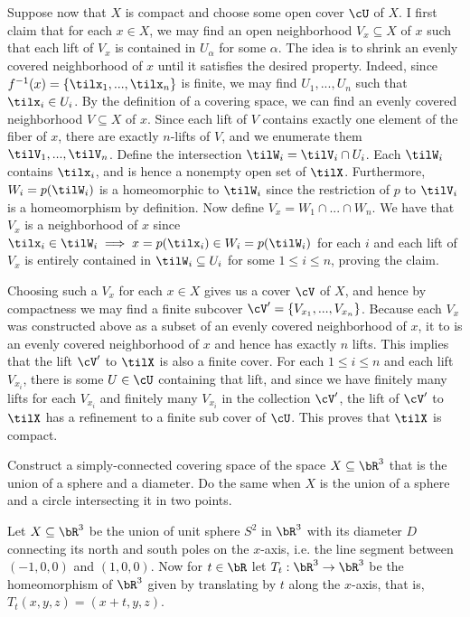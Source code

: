 \begin{homework}[e]
\begin{prf}
    Suppose now that $X$ is compact and choose some open cover $\cU$ of $X$. I first claim that for each $x \in X$, we may find an open neighborhood $V_x\subseteq X$ of $x$ such that each lift of $V_x$ is contained in $U_\alpha$ for some $\alpha$. The idea is to shrink an evenly covered neighborhood of $x$ until it satisfies the desired property. Indeed, since $f^{-1}(x) = \{\tilx_1,...,\tilx_n\}$ is finite, we may find $U_1,...,U_n$ such that $\tilx_i \in U_i$. By the definition of a covering space, we can find an evenly covered neighborhood $V\subseteq X$ of $x$. Since each lift of $V$ contains exactly one element of the fiber of $x$, there are exactly $n$-lifts of $V$, and we enumerate them $\tilV_1,...,\tilV_n$. Define the intersection $\tilW_i = \tilV_i \cap U_i$. Each $\tilW_i$ contains $\tilx_i$, and is hence a nonempty open set of $\tilX$. Furthermore, $W_i = p(\tilW_i)$ is a homeomorphic to $\tilW_i$ since the restriction of $p$ to $\tilV_i$ is a homeomorphism by definition. Now define $V_x = W_1\cap ...\cap W_n$. We have that $V_x$ is a neighborhood of $x$ since $\tilx_i \in \tilW_i \implies x = p(\tilx_i)\in W_i = p(\tilW_i)$ for each $i$ and each lift of $V_x$ is entirely contained in $\tilW_i \subseteq U_i$ for some $1\leq i\leq n$, proving the claim. 

    Choosing such a $V_x$ for each $x \in X$ gives us a cover $\cV$ of $X$, and hence by compactness we may find a finite subcover $\cV' = \{V_{x_1},...,V_{x_n}\}$. Because each $V_x$ was constructed above as a subset of an evenly covered neighborhood of $x$, it to is an evenly covered neighborhood of $x$ and hence has exactly $n$ lifts. This implies that the lift $\cV'$ to $\tilX$ is also a finite cover. For each $1\leq i\leq n$ and each lift $V_{x_i}$, there is some $U \in \cU$ containing that lift, and since we have finitely many lifts for each $V_{x_i}$ and finitely many $V_{x_i}$ in the collection $\cV'$, the lift of $\cV'$ to $\tilX$ has a refinement to a finite sub cover of $\cU$. This proves that $\tilX$ is compact.
  \end{prf} 

   Construct a simply-connected covering space of the space $X\subseteq \bR^3$ that is the union of a sphere and a diameter. Do the same when $X$ is the union of a sphere and a circle intersecting it in two points.
  \begin{prf}
    Let $X\subseteq \bR^3$ be the union of unit sphere $S^2$ in $\bR^3$ with its diameter $D$ connecting its north and south poles on the $x$-axis, i.e. the line segment between $(-1,0,0)$ and $(1,0,0)$. Now for $t \in \bR$ let $T_t:\bR^3\to \bR^3$ be the homeomorphism of $\bR^3$ given by translating by $t$ along the $x$-axis, that is, $T_t(x,y,z) = (x+t,y,z)$.


\end{prf}
\end{homework}
